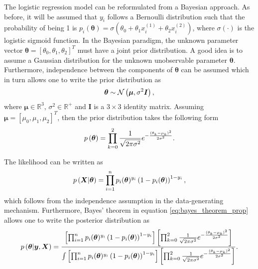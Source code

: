 The logistic regression model can be reformulated from a Bayesian approach. As before, it will be assumed that $y_i$ follows a Bernoulli distribution such that the probability of being 1 is $p_i(\boldsymbol{\theta}) = \sigma(\theta_0 + \theta_1 x_i^{(1)} + \theta_2 x_i^{(2)})$, where $\sigma \left( \cdot \right)$ is the logistic sigmoid function. In the Bayesian paradigm, the unknown parameter vector $\boldsymbol{\boldsymbol{\theta}} = \left[ \theta_0, \theta_1, \theta_2 \right]^T$ must have a joint prior distribution. A good idea is to assume a Gaussian distribution for the unknown unobservable parameter $\boldsymbol{\boldsymbol{\theta}}$. Furthermore, independence between the components of $\boldsymbol{\boldsymbol{\theta}}$ can be assumed which in turn allows one to write the prior distribution as
\begin{equation}
  \boldsymbol{\theta} \sim \mathcal{N}\left( \boldsymbol{\mu}, \sigma^2 \boldsymbol{I} \right),
\end{equation}
where $\boldsymbol{\mu} \in \mathbb{R}^3$, $\sigma^2 \in \mathbb{R}^+$ and $\boldsymbol{I}$ is a $3 \times 3$ identity matrix.
Assuming $\boldsymbol{\mu} = \left[ \mu_0, \mu_1, \mu_2 \right]^T$, then the prior distribution takes the following form
\begin{equation}
  p\left( \boldsymbol{\theta} \right) = \prod_{k = 0}^2 \frac{1}{\sqrt{2 \pi \sigma^2}} e^{- \frac{(\theta_k - \mu_k)^2}{2\sigma^2}}.
\end{equation}

The likelihood can be written as
\begin{equation}
  p\left( \boldsymbol{X} | \boldsymbol{\theta} \right) = \prod_{i = 1}^n  p_i(\boldsymbol{\theta})^{y_i}\left(1 - p_i(\boldsymbol{\theta}) \right)^{1 - y_i},
\end{equation}
which follows from the independence assumption in the data-generating mechanism. Furthermore, Bayes' theorem in equation \eqref{eq:bayes_theorem_prop} allows one to write the posterior distribution as
\begin{equation}
  p\left( \boldsymbol{\theta} | \boldsymbol{y}, \boldsymbol{X} \right) =
    \frac
    {
      \left[ \prod_{i = 1}^n  p_i(\boldsymbol{\theta})^{y_i}\left(1 - p_i(\boldsymbol{\theta}) \right)^{1 - y_i} \right]
      \left[ \prod_{k = 0}^2 \frac{1}{\sqrt{2 \pi \sigma^2}} e^{- \frac{(\theta_k - \mu_k)^2}{2\sigma^2}} \right]
    }{
      \int \left[ \prod_{i = 1}^n  p_i(\boldsymbol{\theta})^{y_i}\left(1 - p_i(\boldsymbol{\theta}) \right)^{1 - y_i} \right]
      \left[ \prod_{k = 0}^2 \frac{1}{\sqrt{2 \pi \sigma^2}} e^{- \frac{(\theta_k - \mu_k)^2}{2\sigma^2}} \right]
    }.
\end{equation}

